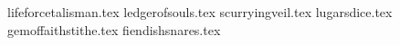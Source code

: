 
\raggedcolumns
\begin{multicols}{2}
\startsortedpricelistNSP
{lifeforcetalisman.tex}
{ledgerofsouls.tex}
{scurryingveil.tex}
{lugarsdice.tex}
{gemoffaithstithe.tex}
{fiendishsnares.tex}
\endsortedpricelistNSP
\end{multicols}

